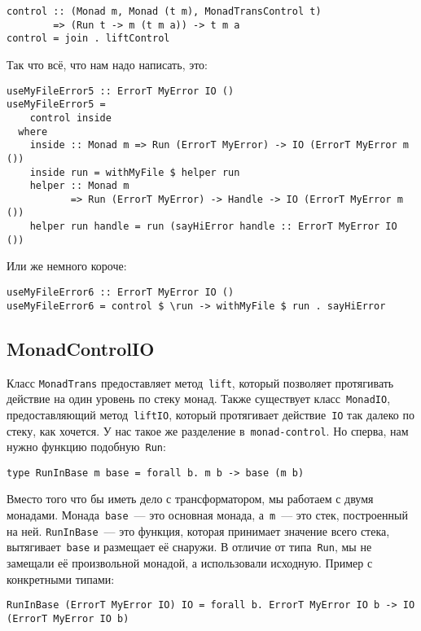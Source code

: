 \begin{lstlisting}
control :: (Monad m, Monad (t m), MonadTransControl t)
        => (Run t -> m (t m a)) -> t m a
control = join . liftControl
\end{lstlisting}

Так что всё, что нам надо написать, это:

\begin{lstlisting}
useMyFileError5 :: ErrorT MyError IO ()
useMyFileError5 =
    control inside
  where
    inside :: Monad m => Run (ErrorT MyError) -> IO (ErrorT MyError m ())
    inside run = withMyFile $ helper run
    helper :: Monad m
           => Run (ErrorT MyError) -> Handle -> IO (ErrorT MyError m ())
    helper run handle = run (sayHiError handle :: ErrorT MyError IO ())
\end{lstlisting}

Или же немного короче:

\begin{lstlisting}
useMyFileError6 :: ErrorT MyError IO ()
useMyFileError6 = control $ \run -> withMyFile $ run . sayHiError
\end{lstlisting}

\subsection{MonadControlIO}
Класс \lstinline'MonadTrans' предоставляет метод~\lstinline'lift', который
позволяет протягивать действие на один уровень по стеку монад. Также существует
класс~\lstinline'MonadIO', предоставляющий метод~\lstinline'liftIO', который
протягивает действие~\lstinline'IO' так далеко по стеку, как хочется. У нас
такое же разделение в~\texttt{monad-control}. Но сперва, нам нужно функцию
подобную~\lstinline'Run':

\begin{lstlisting}
type RunInBase m base = forall b. m b -> base (m b)
\end{lstlisting}

Вместо того что бы иметь дело с трансформатором, мы работаем с двумя монадами.
Монада~\lstinline'base'~--- это основная монада, а~\lstinline'm'~--- это стек,
построенный на ней. \lstinline'RunInBase'~--- это функция, которая принимает
значение всего стека, вытягивает~\lstinline'base' и размещает её снаружи. В
отличие от типа~\lstinline'Run', мы не замещали её произвольной монадой, а
использовали исходную. Пример с конкретными типами:

\begin{lstlisting}
RunInBase (ErrorT MyError IO) IO = forall b. ErrorT MyError IO b -> IO (ErrorT MyError IO b)
\end{lstlisting}

